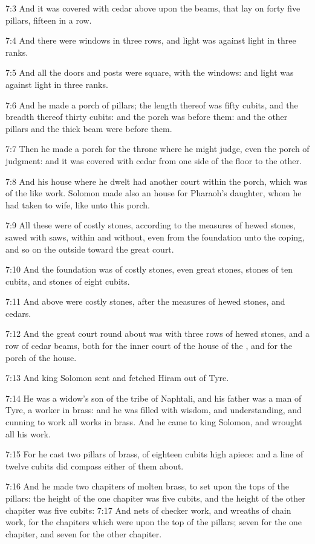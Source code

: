7:3 And it was covered with cedar above upon the beams, that lay on
forty five pillars, fifteen in a row.

7:4 And there were windows in three rows, and light was against light
in three ranks.

7:5 And all the doors and posts were square, with the windows: and
light was against light in three ranks.

7:6 And he made a porch of pillars; the length thereof was fifty
cubits, and the breadth thereof thirty cubits: and the porch was
before them: and the other pillars and the thick beam were before
them.

7:7 Then he made a porch for the throne where he might judge, even the
porch of judgment: and it was covered with cedar from one side of the
floor to the other.

7:8 And his house where he dwelt had another court within the porch,
which was of the like work. Solomon made also an house for Pharaoh's
daughter, whom he had taken to wife, like unto this porch.

7:9 All these were of costly stones, according to the measures of
hewed stones, sawed with saws, within and without, even from the
foundation unto the coping, and so on the outside toward the great
court.

7:10 And the foundation was of costly stones, even great stones,
stones of ten cubits, and stones of eight cubits.

7:11 And above were costly stones, after the measures of hewed stones,
and cedars.

7:12 And the great court round about was with three rows of hewed
stones, and a row of cedar beams, both for the inner court of the
house of the \LORD, and for the porch of the house.

7:13 And king Solomon sent and fetched Hiram out of Tyre.

7:14 He was a widow's son of the tribe of Naphtali, and his father was
a man of Tyre, a worker in brass: and he was filled with wisdom, and
understanding, and cunning to work all works in brass. And he came to
king Solomon, and wrought all his work.

7:15 For he cast two pillars of brass, of eighteen cubits high apiece:
and a line of twelve cubits did compass either of them about.

7:16 And he made two chapiters of molten brass, to set upon the tops
of the pillars: the height of the one chapiter was five cubits, and
the height of the other chapiter was five cubits: 7:17 And nets of
checker work, and wreaths of chain work, for the chapiters which were
upon the top of the pillars; seven for the one chapiter, and seven for
the other chapiter.

